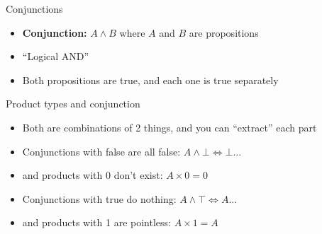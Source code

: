 \documentclass{beamer}
\begin{document}
\begin{frame}{Conjunctions}
    \begin{itemize}
        \item \textbf{Conjunction:} $A \land B$ where $A$ and $B$ are propositions
        \item ``Logical AND''
        \item Both propositions are true, and each one is true separately
    \end{itemize}

    \begin{prooftree}
    \end{prooftree}

    \begin{prooftree}
    \end{prooftree}
    
    \begin{prooftree}
    \end{prooftree}
\end{frame}

\begin{frame}{Product types and conjunction}
    \begin{itemize}
        \item Both are combinations of 2 things, and you can ``extract'' each part
        \item Conjunctions with false are all false: $A \land \bot \iff \bot$...
        \item and products with 0 don't exist: $A \times 0 = 0$
        \item Conjunctions with true do nothing: $A \land \top \iff A$...
        \item and products with 1 are pointless: $A \times 1 = A$
    \end{itemize}
\end{frame}
\end{document}
